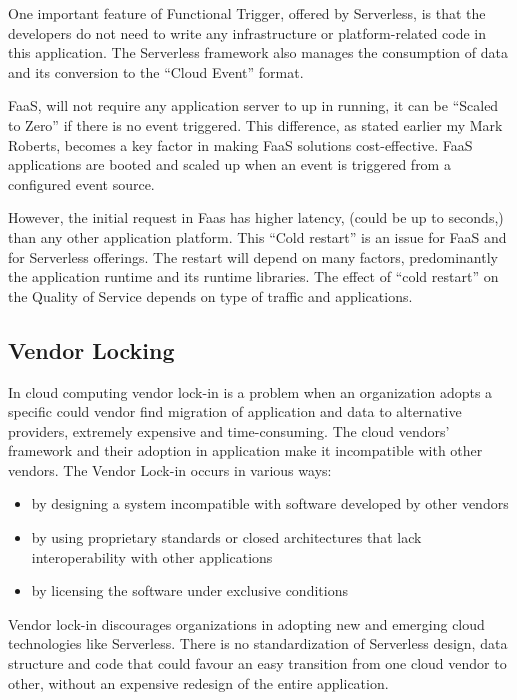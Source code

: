 \documentclass[12pt]{article}
\begin{document}
\begin{flushleft}
One important feature of Functional Trigger, offered by Serverless, is that the developers do not need to write any infrastructure or platform-related code in this application. The Serverless framework also manages the consumption of data and its conversion to the “Cloud Event” format.

FaaS, will not require any application server to up in running, it can be “Scaled to Zero” if there is no event triggered. This difference, as stated earlier my Mark Roberts, becomes a key factor in making FaaS solutions cost-effective. FaaS applications are booted and scaled up when an event is triggered from a configured event source.

However, the initial request in Faas has higher latency, (could be up to seconds,) than any other application platform. This “Cold restart” is an issue for FaaS and for Serverless offerings. The restart will depend on many factors, predominantly the application runtime and its runtime libraries. The effect of “cold restart” on the Quality of Service depends on type of traffic and applications. 

\subsection{Vendor Locking}
In cloud computing vendor lock-in is a problem when an organization adopts a specific could vendor find migration of application and data to alternative providers, extremely expensive and time-consuming. The cloud vendors' framework and their adoption in application make it incompatible with other vendors.
 The Vendor Lock-in occurs in various ways: 
 \begin{itemize}
     \item by designing a system incompatible with software developed by other vendors
     \item by using proprietary standards or closed architectures that lack interoperability with other applications
     \item by licensing the software under exclusive conditions
 \end{itemize}

 Vendor lock-in discourages organizations in adopting new and emerging cloud technologies like Serverless. There is no standardization of Serverless design, data structure and code that could favour an easy transition from one cloud vendor to other, without an expensive redesign of the entire application. 


\end{flushleft}
\end{document}
